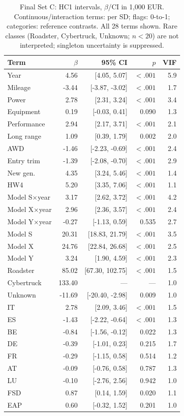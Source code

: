 \begin{table}[h!]
\centering\small\setlength{\tabcolsep}{3pt}
\begin{tabular}{lrrrr}
\toprule
Term & $\beta$ & 95\% CI & $p$ & VIF\\
\midrule
Year & 4.56 & [4.05, 5.07] & $<.001$ & 5.9\\
Mileage & -3.44 & [-3.87, -3.02] & $<.001$ & 1.7\\
Power & 2.78 & [2.31, 3.24] & $<.001$ & 3.4\\
Equipment & 0.19 & [-0.03, 0.41] & 0.090 & 1.3\\
Performance & 2.94 & [2.17, 3.71] & $<.001$ & 2.1\\
Long range & 1.09 & [0.39, 1.79] & 0.002 & 2.0\\
AWD & -1.46 & [-2.23, -0.69] & $<.001$ & 2.4\\
Entry trim & -1.39 & [-2.08, -0.70] & $<.001$ & 2.9\\
New gen. & 4.35 & [3.24, 5.46] & $<.001$ & 1.4\\
HW4 & 5.20 & [3.35, 7.06] & $<.001$ & 1.1\\
Model S$\times$year & 3.17 & [2.62, 3.72] & $<.001$ & 4.2\\
Model X$\times$year & 2.96 & [2.36, 3.57] & $<.001$ & 2.4\\
Model Y$\times$year & -0.27 & [-1.13, 0.59] & 0.535 & 2.7\\
Model S & 20.31 & [18.83, 21.79] & $<.001$ & 3.5\\
Model X & 24.76 & [22.84, 26.68] & $<.001$ & 2.5\\
Model Y & 3.24 & [1.90, 4.59] & $<.001$ & 2.3\\
Roadster & 85.02 & [67.30, 102.75] & $<.001$ & 1.5\\
Cybertruck & 133.40 & --- & --- & 1.0\\
Unknown & -11.69 & [-20.40, -2.98] & 0.009 & 1.0\\
IT & 2.78 & [2.09, 3.46] & $<.001$ & 1.5\\
ES & -1.43 & [-2.22, -0.64] & $<.001$ & 1.3\\
BE & -0.84 & [-1.56, -0.12] & 0.022 & 1.3\\
DE & -0.39 & [-1.01, 0.23] & 0.215 & 1.7\\
FR & -0.29 & [-1.15, 0.58] & 0.514 & 1.2\\
AT & -0.09 & [-0.76, 0.58] & 0.787 & 1.3\\
LU & -0.10 & [-2.76, 2.56] & 0.942 & 1.0\\
FSD & 0.87 & [0.14, 1.59] & 0.020 & 1.1\\
EAP & 0.60 & [-0.32, 1.52] & 0.201 & 1.0\\
\bottomrule
\end{tabular}
\caption{Final Set C: HC1 intervals, $\beta$/CI in 1,000 EUR. Continuous/interaction terms: per SD; flags: 0-to-1; categories: reference contrasts. All 28 terms shown. Rare classes (Roadster, Cybertruck, Unknown; $n<20$) are not interpreted; singleton uncertainty is suppressed.}
\label{tab:coef}
\end{table}
